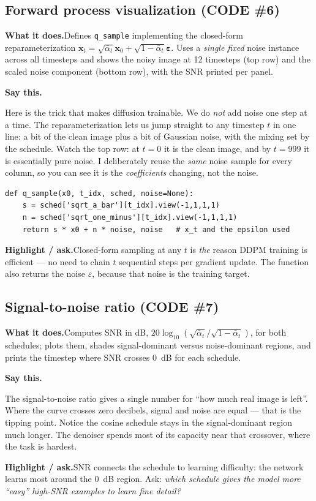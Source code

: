 \documentclass[11pt]{article}
\newenvironment{saythis}{%
  \par\smallskip\noindent
  \begin{list}{}{%
    \setlength{\leftmargin}{1.2em}%
    \setlength{\rightmargin}{0.5em}%
    \setlength{\topsep}{2pt}%
  }\item\relax
  \color{sayrule}\textbf{Say this.}\hspace{0.4em}\color{black}\itshape
}{%
  \end{list}\par\smallskip
}
\newcommand{\highlight}[1]{\par\smallskip\noindent\textcolor{hlcolor}{\textbf{Highlight / ask.}}\hspace{0.4em}#1\par\smallskip}
\newcommand{\whatdoes}[1]{\par\noindent\textbf{What it does.}\hspace{0.4em}#1\par}
\begin{document}
\subsection{Forward process visualization (CODE \#6)}
\whatdoes{Defines \texttt{q\_sample} implementing the closed-form reparameterization
$\mathbf{x}_t = \sqrt{\bar\alpha_t}\mathbf{x}_0 + \sqrt{1-\bar\alpha_t}\boldsymbol\varepsilon$.
Uses a \emph{single fixed} noise instance across all timesteps and shows the noisy image at 12
timesteps (top row) and the scaled noise component (bottom row), with the SNR printed per panel.}
\begin{saythis}
Here is the trick that makes diffusion trainable. We do \emph{not} add noise one step at a time. The
reparameterization lets us jump straight to any timestep $t$ in one line: a bit of the clean image
plus a bit of Gaussian noise, with the mixing set by the schedule. Watch the top row: at $t=0$ it is
the clean image, and by $t=999$ it is essentially pure noise. I deliberately reuse the \emph{same}
noise sample for every column, so you can see it is the \emph{coefficients} changing, not the noise.
\end{saythis}
\begin{lstlisting}
def q_sample(x0, t_idx, sched, noise=None):
    s = sched['sqrt_a_bar'][t_idx].view(-1,1,1,1)
    n = sched['sqrt_one_minus'][t_idx].view(-1,1,1,1)
    return s * x0 + n * noise, noise   # x_t and the epsilon used
\end{lstlisting}
\highlight{Closed-form sampling at any $t$ is \emph{the} reason DDPM training is efficient --- no need
to chain $t$ sequential steps per gradient update. The function also returns the noise $\varepsilon$,
because that noise is the training target.}

\subsection{Signal-to-noise ratio (CODE \#7)}
\whatdoes{Computes SNR in dB, $20\log_{10}(\sqrt{\bar\alpha_t}/\sqrt{1-\bar\alpha_t})$, for both
schedules; plots them, shades signal-dominant versus noise-dominant regions, and prints the timestep
where SNR crosses 0~dB for each schedule.}
\begin{saythis}
The signal-to-noise ratio gives a single number for ``how much real image is left''. Where the curve
crosses zero decibels, signal and noise are equal --- that is the tipping point. Notice the cosine
schedule stays in the signal-dominant region much longer. The denoiser spends most of its capacity
near that crossover, where the task is hardest.
\end{saythis}
\highlight{SNR connects the schedule to learning difficulty: the network learns most around the
$0$~dB region. Ask: \emph{which schedule gives the model more ``easy'' high-SNR examples to learn fine
detail?}}
\end{document}

